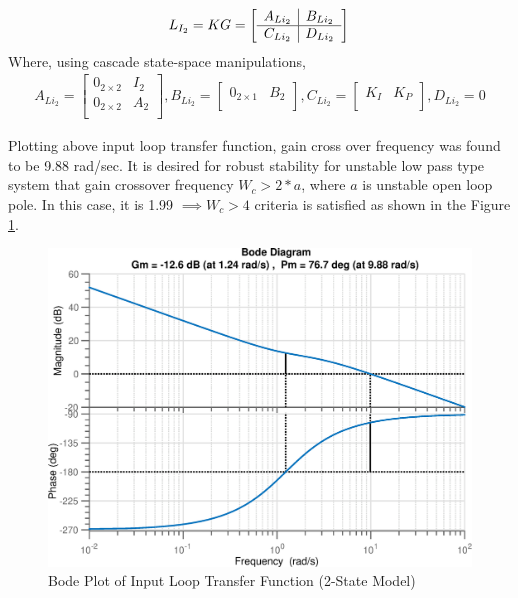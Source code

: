 \documentclass[12pt]{article}
\begin{document}
	\begin{equation}
	L_{I_2} = KG =
	\left[
	\begin{array}{c | c}
	A_{Li_2} & B_{Li_2}\\ \hline
	C_{Li_2} & D_{Li_2}
	\end{array}\right] \\
	\end{equation}
	Where, using cascade state-space manipulations,
	\begin{equation}
	\begin{split}
	A_{Li_2}  = \begin{bmatrix}
	0_{2 \times 2} & I_2\\
	0_{2 \times 2} & A_2\\
	\end{bmatrix},
	B_{Li_2}  =  \begin{bmatrix} 
	0_{2 \times 1} & B_2 \\
	\end{bmatrix},
	C_{Li_2}  = \begin{bmatrix} 
	K_{I} & K_{P} \\
	\end{bmatrix},
	D_{Li_2}  = 0
	\end{split}
	\end{equation}
	
	\noindent Plotting above input loop transfer function, gain cross over frequency was found to be 9.88 rad/sec. It is desired for robust stability for unstable low pass type system that gain crossover frequency $W_c > 2*a$, where $a$ is unstable open loop pole. In this case, it is 1.99 $\implies W_c > 4$ criteria is satisfied as shown in the Figure \ref{fig:bode2states}.
	
	\begin{figure}[H]
		\centering
		\includegraphics[width=0.75\linewidth]{InputLoopBode_2states}
		\caption{Bode Plot of Input Loop Transfer Function (2-State Model)}
		\label{fig:bode2states}
	\end{figure}
	
\end{document}
